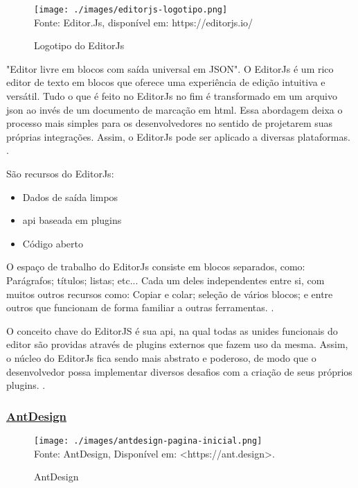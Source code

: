 \begin{figure}[H]
    \centering
    \caption{Logotipo do EditorJs}
    \texttt{[image: ./images/editorjs-logotipo.png]}
    \label{fig:editorjs-logotipo} \\
    \textnormal{\fontsize{10pt}{12pt}Fonte: Editor.Js, disponível em: https://editorjs.io/}
\end{figure}

"Editor livre em blocos com saída universal em JSON".
O EditorJs é um rico editor de texto em blocos que oferece uma experiência de
edição intuitiva e versátil. Tudo o que é feito no EditorJs no fim é transformado
em um arquivo \acrshort{json} ao invés de um documento de marcação
em \acrshort{html}.
Essa abordagem deixa o processo mais simples para os desenvolvedores no
sentido de projetarem suas próprias integrações. Assim, o EditorJs pode ser
aplicado a diversas plataformas.
\cite{editorjs}.

São recursos do EditorJs:

\begin{itemize}
        
	\item Dados de saída limpos
	\item \acrshort{api} baseada em plugins
	\item Código aberto
    
\end{itemize}

O espaço de trabalho do EditorJs consiste em blocos separados, como:
Parágrafos; títulos; listas; etc... Cada um deles independentes entre si,
com muitos outros recursos como: Copiar e colar; seleção de vários blocos;
e entre outros que funcionam de forma familiar a outras ferramentas.
\cite{editorjs}.

O conceito chave do EditorJS é sua \acrshort{api}, na qual
todas as unides funcionais do editor são providas através de plugins externos que fazem
uso da mesma. Assim, o núcleo do EditorJs fica sendo mais abstrato e poderoso, de
modo que o desenvolvedor possa implementar diversos desafios com a criação
de seus próprios plugins.
\cite{editorjs}.

\subsubsection{\underline{AntDesign}}

\begin{figure}[H]
    \centering
    \caption{AntDesign}
    \texttt{[image: ./images/antdesign-pagina-inicial.png]}
    \label{fig:antdesign-pagina-inicial} \\
    \textnormal{\fontsize{10pt}{12pt}Fonte: AntDesign, Disponível em: <https://ant.design>.}
\end{figure}

